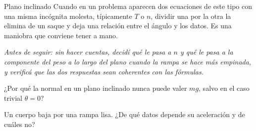 \documentclass[11pt,openany]{book}
\begin{document}
\begin{bloque}{Plano inclinado}
Cuando en un problema aparecen dos ecuaciones de este tipo con una misma incógnita molesta, típicamente $T$ o $n$, dividir una por la otra la elimina de un saque y deja una relación entre el ángulo y los datos. Es una maniobra que conviene tener a mano.

\textit{Antes de seguir: sin hacer cuentas, decidí qué le pasa a $n$ y qué le pasa a la componente del peso a lo largo del plano cuando la rampa se hace más empinada, y verificá que las dos respuestas sean coherentes con las fórmulas.}
\end{bloque}

\begin{chequeo}
\item ¿Por qué la normal en un plano inclinado nunca puede valer $mg$, salvo en el caso trivial $\theta = 0$?
\item Un cuerpo baja por una rampa lisa. ¿De qué datos depende su aceleración y de cuáles no?
\end{chequeo}
\end{document}
